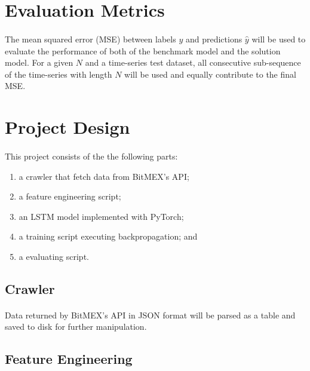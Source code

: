 \documentclass[12pt, letterpaper]{article}
\begin{document}
\section{Evaluation Metrics}

\paragraph{}
The mean squared error (MSE) between labels $y$ and predictions $\hat y$ will be used to evaluate the performance of both of the benchmark model and the solution model. For a given $N$ and a time-series test dataset, all consecutive sub-sequence of the time-series with length $N$ will be used and equally contribute to the final MSE.

\section{Project Design}

\paragraph{}
This project consists of the the following parts:

\begin{enumerate}
    \item a crawler that fetch data from BitMEX's API;
    \item a feature engineering script;
    \item an LSTM model implemented with PyTorch;
    \item a training script executing backpropagation; and
    \item a evaluating script.
\end{enumerate}

\subsection{Crawler}

\paragraph{}
Data returned by BitMEX's API in JSON format will be parsed as a table and saved to disk for further manipulation.

\subsection{Feature Engineering}
\end{document}
